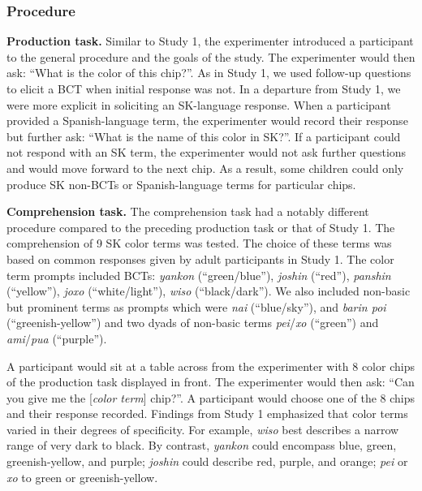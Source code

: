 \documentclass[
  english,
  ,man,floatsintext]{apa6}
\begin{document}
\hypertarget{procedure}{%
\subsubsection{Procedure}\label{procedure}}

\textbf{Production task.} Similar to Study 1, the experimenter introduced a participant to the general procedure and the goals of the study. The experimenter would then ask: \enquote{What is the color of this chip?}. As in Study 1, we used follow-up questions to elicit a BCT when initial response was not. In a departure from Study 1, we were more explicit in soliciting an SK-language response. When a participant provided a Spanish-language term, the experimenter would record their response but further ask: \enquote{What is the name of this color in SK?}. If a participant could not respond with an SK term, the experimenter would not ask further questions and would move forward to the next chip. As a result, some children could only produce SK non-BCTs or Spanish-language terms for particular chips.

\textbf{Comprehension task.} The comprehension task had a notably different procedure compared to the preceding production task or that of Study 1. The comprehension of 9 SK color terms was tested. The choice of these terms was based on common responses given by adult participants in Study 1. The color term prompts included BCTs: \emph{yankon} (\enquote{green/blue}), \emph{joshin} (\enquote{red}), \emph{panshin} (\enquote{yellow}), \emph{joxo} (\enquote{white/light}), \emph{wiso} (\enquote{black/dark}). We also included non-basic but prominent terms as prompts which were \emph{nai} (\enquote{blue/sky}), and \emph{barin poi} (\enquote{greenish-yellow}) and two dyads of non-basic terms \emph{pei}/\emph{xo} (\enquote{green}) and \emph{ami}/\emph{pua} (\enquote{purple}).

A participant would sit at a table across from the experimenter with 8 color chips of the production task displayed in front. The experimenter would then ask: \enquote{Can you give me the {[}\emph{color term}{]} chip?}. A participant would choose one of the 8 chips and their response recorded. Findings from Study 1 emphasized that color terms varied in their degrees of specificity. For example, \emph{wiso} best describes a narrow range of very dark to black. By contrast, \emph{yankon} could encompass blue, green, greenish-yellow, and purple; \emph{joshin} could describe red, purple, and orange; \emph{pei} or \emph{xo} to green or greenish-yellow.
\end{document}
